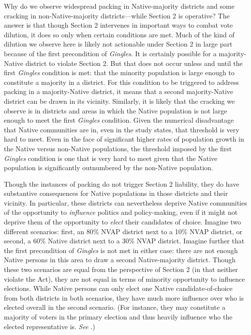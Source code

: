\documentclass[12pt]{article}
\begin{document}
Why do we observe widespread packing in Native-majority districts and some cracking in non-Native-majority districts---while Section 2 is operative?  The answer is that though Section 2 intervenes in important ways to combat vote dilution, it does so only when certain conditions are met.  Much of the kind of dilution we observe here is likely not actionable under Section 2 in large part because of the first precondition of \textit{Gingles}.  It is certainly possible for a majority-Native district to violate Section 2.  But that does not occur unless and until the first \textit{Gingles} condition is met: that the minority population is large enough to constitute a majority in a district.  For this condition to be triggered to address packing in a majority-Native district, it means that a second majority-Native district can be drawn in its vicinity.  Similarly, it is likely that the cracking we observe is in districts and areas in which the Native population is not large enough to meet the first \textit{Gingles} condition.  Given the numerical disadvantage that Native communities are in, even in the study states, that threshold is very hard to meet.  Even in the face of significant higher rates of population growth in the Native versus non-Native populations, the threshold imposed by the first \textit{Gingles} condition is one that is very hard to meet given that the Native population is significantly outnumbered by the non-Native population.   

Though the instances of packing do not trigger Section 2 liability, they do have substantive consequences for Native populations in those districts and their vicinity.  In particular, these districts can nevertheless deprive Native communities of the opportunity to \textit{influence} politics and policy-making, even if it might not deprive them of the opportunity to \textit{elect} their candidates of choice. Imagine two different scenarios: first, an 80\% NVAP district next to a 10\% NVAP district, or second, a 60\% Native district next to a 30\% NVAP district. Imagine further that the first precondition of \textit{Gingles} is not met in either case: there are not enough Native persons in this area to draw a second Native-majority district. Though these two scenarios are equal from the perspective of Section 2 (in that neither violate the Act), they are not equal in terms of minority opportunity to influence elections.  While Native persons can only elect one Native candidate-of-choice from both districts in both scenarios, they have much more influence over who is elected overall in the second scenario. (For instance, they may constitute a majority of voters in the primary election and thus heavily influence who the elected representative is. \textit{See }\cite{katz2004resurrecting}.) 
\end{document}
